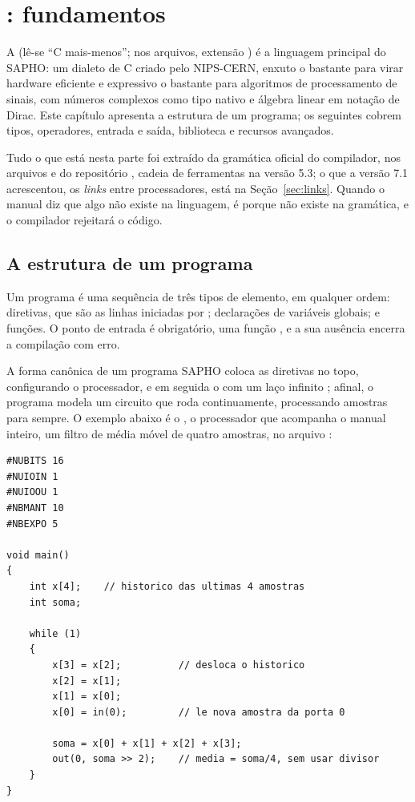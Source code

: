 \chapter{\cmm{}: fundamentos}
\label{cap:cmm-fundamentos}

A \cmm{} (lê-se \enquote{C mais-menos}; nos arquivos, extensão ) é a linguagem principal do SAPHO: um dialeto de C criado pelo NIPS-CERN, enxuto o bastante para virar hardware eficiente e expressivo o bastante para algoritmos de processamento de sinais, com números complexos como tipo nativo e álgebra linear em notação de Dirac. Este capítulo apresenta a estrutura de um programa; os seguintes cobrem tipos, operadores, entrada e saída, biblioteca e recursos avançados.

\begin{nota}
Tudo o que está nesta parte foi extraído da gramática oficial do compilador, nos arquivos  e  do repositório , cadeia de ferramentas na versão 5.3; o que a versão 7.1 acrescentou, os \textit{links} entre processadores, está na Seção~\ref{sec:links}. Quando o manual diz que algo não existe na linguagem, é porque não existe na gramática, e o compilador rejeitará o código.
\end{nota}

\section{A estrutura de um programa}

Um programa \cmm{} é uma sequência de três tipos de elemento, em qualquer ordem: diretivas, que são as linhas iniciadas por \code{\#}; declarações de variáveis globais; e funções. O ponto de entrada é obrigatório, uma função , e a sua ausência encerra a compilação com erro.

A forma canônica de um programa SAPHO coloca as diretivas no topo, configurando o processador, e em seguida o  com um laço infinito ; afinal, o programa modela um circuito que roda continuamente, processando amostras para sempre. O exemplo abaixo é o , o processador que acompanha o manual inteiro, um filtro de média móvel de quatro amostras, no arquivo :

\begin{lstlisting}[style=cmm]
#NUBITS 16
#NUIOIN 1
#NUIOOU 1
#NBMANT 10
#NBEXPO 5

void main()
{
    int x[4];    // historico das ultimas 4 amostras
    int soma;

    while (1)
    {
        x[3] = x[2];          // desloca o historico
        x[2] = x[1];
        x[1] = x[0];
        x[0] = in(0);         // le nova amostra da porta 0

        soma = x[0] + x[1] + x[2] + x[3];
        out(0, soma >> 2);    // media = soma/4, sem usar divisor
    }
}
\end{lstlisting}


